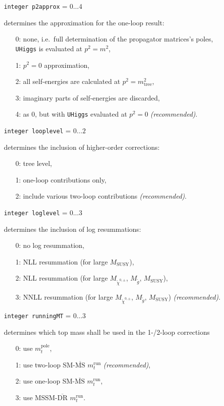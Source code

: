 \documentclass[12pt,a4paper]{report}
\newcommand{\CODE}[1]{\texttt{#1}}
\newcommand{\FLAGIN}[3]{%
  \item[\fbox{\scriptsize\textsc{in}}]
  \CODE{#1} = $#2\dots#3$ \par}
\newcommand\ie{i.e.\ }
\begin{document}
\FLAGIN{integer p2approx}{0}{4}
determines the approximation for the one-loop result:
\begin{itemize}
\item[0:] none, \ie full determination of the propagator matrices's poles, \\
  \CODE{UHiggs} is evaluated at $p^2 = m^2$,
\item[1:] $p^2 = 0$ approximation,
\item[2:] all self-energies are calculated at $p^2 = m_{\text{tree}}^2$,
\item[3:] imaginary parts of self-energies are discarded,
\item[4:] as 0, but with \CODE{UHiggs} evaluated at $p^2 = 0$
  \textit{(recommended)}.
\end{itemize}

\FLAGIN{integer looplevel}{0}{2}
determines the inclusion of higher-order corrections:
\begin{itemize}
\item[0:] tree level,
\item[1:] one-loop contributions only,
\item[2:] include various two-loop contributions
  \textit{(recommended)}.
\end{itemize}

\FLAGIN{integer loglevel}{0}{3}
determines the inclusion of log resummations:
\begin{itemize}
\item[0:] no log resummation,
\item[1:] NLL resummation (for large $M_{\text{SUSY}}$),
\item[2:] NLL resummation (for large $M_{\tilde\chi^{0,\pm}}$,
  $M_{\tilde g}$, $M_{\text{SUSY}}$),
\item[3:] NNLL resummation (for large $M_{\tilde\chi^{0,\pm}}$,
  $M_{\tilde g}$, $M_{\text{SUSY}}$)
  \textit{(recommended)}.
\end{itemize}

\FLAGIN{integer runningMT}{0}{3}
determines which top mass shall be used in the 1-/2-loop corrections 
\begin{itemize}
\item[0:] use $m_t^{\text{pole}}$,
\item[1:] use two-loop SM-$\overline{\text{MS}}$ $m_t^{\text{run}}$
  \textit{(recommended)},
\item[2:] use one-loop SM-$\overline{\text{MS}}$ $m_t^{\text{run}}$,
\item[3:] use MSSM-$\overline{\text{DR}}$ $m_t^{\text{run}}$.
\end{itemize}
\end{document}
